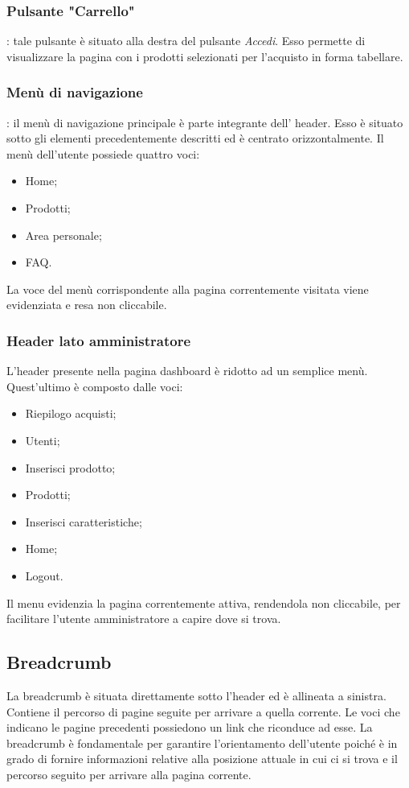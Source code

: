 \subsubsection{Pulsante "Carrello"}: tale pulsante è situato alla destra del pulsante \textit{Accedi}. Esso permette di visualizzare la pagina con i prodotti selezionati per l'acquisto in forma tabellare.

\subsubsection{Menù di navigazione}: il menù di navigazione principale è parte integrante dell' header. Esso è situato sotto gli elementi precedentemente descritti ed è centrato orizzontalmente. Il menù dell'utente possiede quattro voci:
\begin{itemize}
    \item Home;
    \item Prodotti;
    \item Area personale;
    \item FAQ.
\end{itemize}
La voce del menù corrispondente alla pagina correntemente visitata viene evidenziata e resa non cliccabile.

\subsubsection{Header lato amministratore}
L'header presente nella pagina dashboard è ridotto ad un semplice menù. Quest'ultimo è composto dalle voci:
\begin{itemize}
	\item Riepilogo acquisti;
	\item Utenti;
	\item Inserisci prodotto;
	\item Prodotti;
	\item Inserisci caratteristiche;
	\item Home;
	\item Logout.
\end{itemize}
Il menu evidenzia la pagina correntemente attiva, rendendola non cliccabile, per facilitare l'utente amministratore a capire dove si trova.

\subsection{Breadcrumb} 
La breadcrumb è situata direttamente sotto l'header ed è allineata a sinistra. Contiene il percorso di pagine seguite per arrivare a quella corrente. Le voci che indicano le pagine precedenti possiedono un link che riconduce ad esse. La breadcrumb è fondamentale per garantire l'orientamento dell'utente poiché è in grado di fornire informazioni relative alla posizione attuale in cui ci si trova e il percorso seguito per arrivare alla pagina corrente. 

